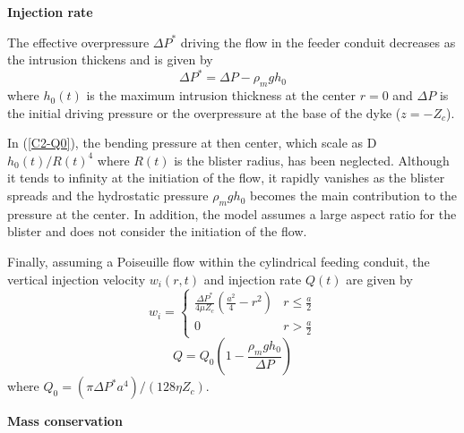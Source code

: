 \vspace{.5cm} \textbf{Injection rate} \vspace{.5cm}

The effective overpressure $\Delta P^*$ driving the flow in the feeder
conduit decreases as the intrusion thickens and is given by
\begin{equation}
  \Delta P^* = \Delta P -\rho_m g h_0 \label{C2-Q0}
\end{equation}
where $h_0(t)$ is the maximum  intrusion thickness at the center $r=0$
and $\Delta P$ is the initial  driving pressure or the overpressure at
the base of the dyke ($z = -Z_c$).

In (\ref{C2-Q0}), the bending pressure  at then center, which scale as
D$h_0(t)/R(t)^4$  where  $R(t)$  is   the  blister  radius,  has  been
neglected.  Although  it tends  to infinity at  the initiation  of the
flow, it rapidly  vanishes as the blister spreads  and the hydrostatic
pressure $\rho_m g h_0$ becomes  the main contribution to the pressure
at the  center.  In addition, the  model assumes a large  aspect ratio
for the blister and does not consider the initiation of the flow.

Finally,  assuming a  Poiseuille flow  within the  cylindrical feeding
conduit, the vertical injection velocity $w_i(r,t)$ and injection rate
$Q(t)$ are given by
\begin{equation}
  w_i=
  \begin{cases}
    \frac{ \Delta P^*}{4 \mu Z_{c}} (\frac{a^{2}}{4}-r^{2})& r \le \frac{a}{2}\\
    0 & r > \frac{a}{2}
  \end{cases}
  \label{C2-eq12}
\end{equation}
\begin{equation}
  Q = Q_0(1-\frac{\rho_m g h_0}{\Delta P})
  \label{C2-eq11}
\end{equation}
where
$Q_0=\left(\pi \Delta P^* a^{4}\right)/\left(128 \eta Z_c\right)$.

\vspace{.5cm} \textbf{Mass conservation} \vspace{.5cm}

